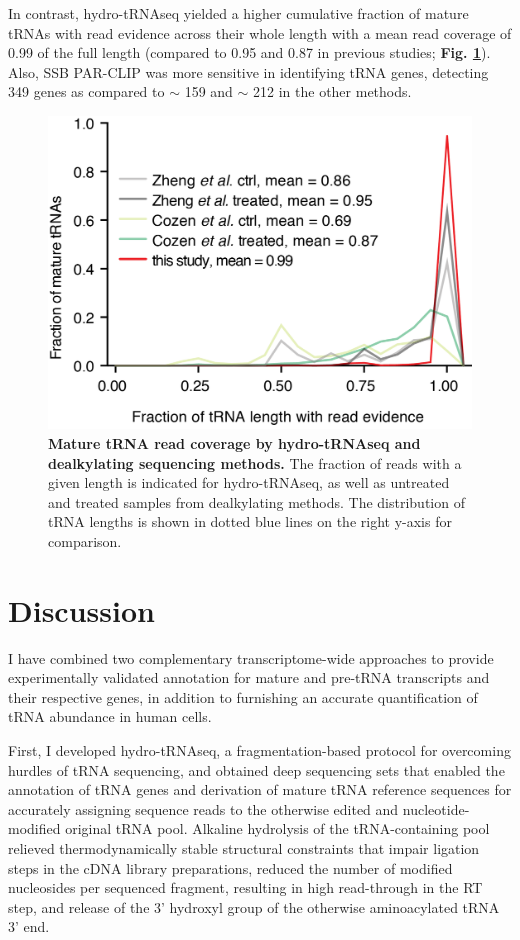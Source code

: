 \documentclass[12pt]{rockefeller}
\begin{document}
In contrast, hydro-tRNAseq yielded a higher cumulative fraction of mature tRNAs with read evidence across their whole length with a mean read coverage of 0.99 of the full length (compared to 0.95 and 0.87 in previous studies; \textbf{Fig. \ref{supp7}}). Also, SSB PAR-CLIP was more sensitive in identifying tRNA genes, detecting 349 genes as compared to $\sim$ 159 and $\sim$ 212 in the other methods.

\begin{figure}[!ht]%
\centering
\includegraphics{supp7.png}%
\caption[Mature tRNA read coverage by hydro-tRNAseq and dealkylating sequencing methods.]
{\textbf{Mature tRNA read coverage by hydro-tRNAseq and dealkylating sequencing methods.}
The fraction of reads with a given length is indicated for hydro-tRNAseq, as well as untreated and treated samples from dealkylating methods. The distribution of tRNA lengths is shown in dotted blue lines on the right y-axis for comparison.
}
\centering
\label{supp7}%
\end{figure}


\chapter{Discussion}
I have combined two complementary transcriptome-wide approaches to provide experimentally validated annotation for mature and pre-tRNA transcripts and their respective genes, in addition to furnishing an accurate quantification of tRNA abundance in human cells.

First, I developed hydro-tRNAseq, a fragmentation-based protocol for overcoming hurdles of tRNA sequencing, and obtained deep sequencing sets that enabled the annotation of tRNA genes and derivation of mature tRNA reference sequences for accurately assigning sequence reads to the otherwise edited and nucleotide-modified original tRNA pool. Alkaline hydrolysis of the tRNA-containing pool relieved thermodynamically stable structural constraints that impair ligation steps in the cDNA library preparations, reduced the number of modified nucleosides per sequenced fragment, resulting in high read-through in the RT step, and release of the 3’ hydroxyl group of the otherwise aminoacylated tRNA 3’ end. 
\end{document}
